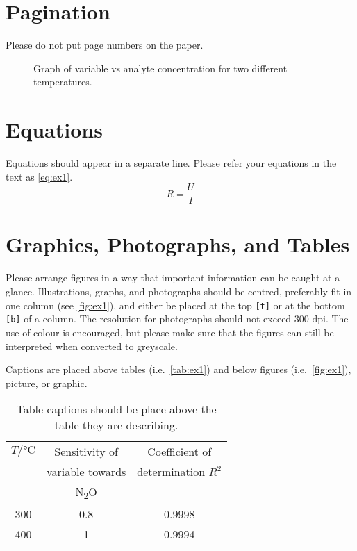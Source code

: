 \documentclass{ama}
\begin{document}
\section{Pagination}
Please do not put page numbers on the paper.
%
\begin{figure}
    \centering
    
    \caption{Graph of variable vs analyte concentration for two different temperatures.}\label{fig:ex1}
\end{figure}

\section{Equations}
Equations should appear in a separate line.
Please refer your equations in the text as \autoref{eq:ex1}.
%
\begin{equation}
    R = \frac{U}{I}\label{eq:ex1}
\end{equation}

\section{Graphics, Photographs, and Tables}
Please arrange figures in a way that important information can be caught at a glance.
Illustrations, graphs, and photographs should be centred, preferably fit in one column (see \autoref{fig:ex1}), and either be placed at the top \texttt{[t]} or at the bottom \texttt{[b]} of a column.
The resolution for photographs should not exceed 300 dpi.
The use of colour is encouraged, but please make sure that the figures can still be interpreted when converted to greyscale.

Captions are placed above tables (i.e.\ \autoref{tab:ex1}) and below figures (i.e.\ \autoref{fig:ex1}), picture, or graphic.
%
\begin{table}
    \caption{Table captions should be place above the table they are describing.}\label{tab:ex1}
    \centering
    \begin{tabular}{ccc}
        \toprule
        \(T / \si{\celsius}\) & Sensitivity of & Coefficient of \\
        & variable towards & determination \(R^2\)  \\
        & N\textsubscript{2}O & \\
        \midrule
        \num{300} & \num{0.8} & \num{0.9998} \\
        \midrule
        \num{400} & \num{1} & \num{0.9994} \\
        \bottomrule
    \end{tabular}
\end{table}
\end{document}
